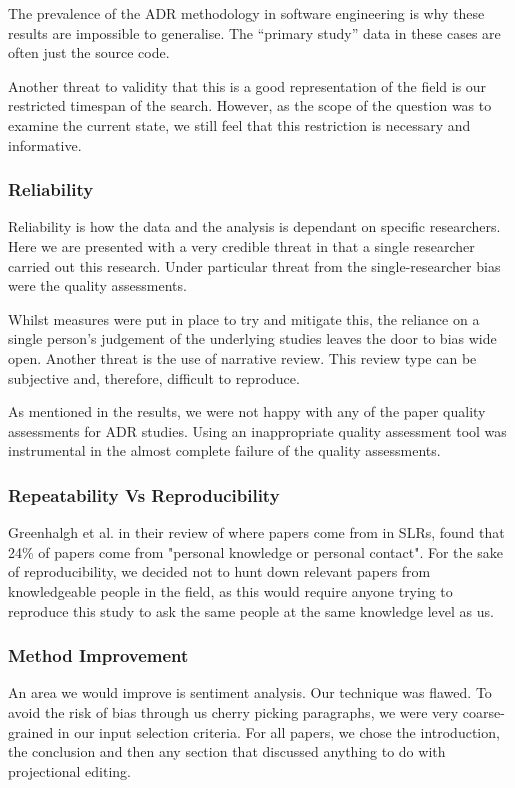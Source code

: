 The prevalence of the ADR methodology in software engineering is why these results are impossible to generalise.
The ``primary study'' data in these cases are often just the source code.

Another threat to validity that this is a good representation of the field is our restricted timespan of the search.
However, as the scope of the question was to examine the current state, we still feel that this restriction is necessary and informative.

\subsubsection{Reliability}
Reliability is how the data and the analysis is dependant on specific researchers.
Here we are presented with a very credible threat in that a single researcher carried out this research.
Under particular threat from the single-researcher bias were the quality assessments. 

Whilst measures were put in place to try and mitigate this, the reliance on a single person's judgement of the underlying studies leaves the door to bias wide open.
Another threat is the use of narrative review. 
This review type can be subjective and, therefore, difficult to reproduce.

As mentioned in the results, we were not happy with any of the paper quality assessments for ADR studies.
Using an inappropriate quality assessment tool was instrumental in the almost complete failure of the quality assessments.


\subsubsection{Repeatability Vs Reproducibility}
Greenhalgh et al.\cite{GreenhalghTrisha2005Eaeo} in their review of where papers come from in SLRs, found that 24\% of papers come from "personal knowledge or personal contact".
For the sake of reproducibility, we decided not to hunt down relevant papers from knowledgeable people in the field, as this would require anyone trying to reproduce this study to ask the same people at the same knowledge level as us.

\subsubsection{Method Improvement}
An area we would improve is sentiment analysis.
Our technique was flawed.
To avoid the risk of bias through us cherry picking paragraphs, we were very coarse-grained in our input selection criteria.
For all papers, we chose the introduction, the conclusion and then any section that discussed anything to do with projectional editing.

